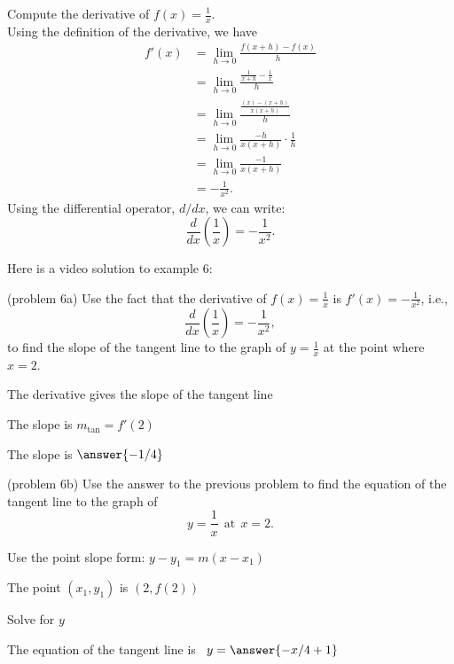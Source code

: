 \documentclass[handout]{ximera}
\begin{document}
\begin{example}[example 6]
Compute the derivative of $f(x) = \displaystyle{\frac{1}{x}}$.\\
Using the definition of the derivative, we have
\begin{align*}
f'(x) &= \lim_{h \to 0} \frac{f(x+h)-f(x)}{h}\\[5pt]
&= \lim_{h \to 0} \frac{\frac{1}{x+h}- \frac{1}{x}}{h}\\[5pt]
&= \lim_{h \to 0} \frac{\frac{(x) - (x+h)}{x(x+h)}}{h} \\[5pt]
&=  \lim_{h \to 0} \frac{-h}{x(x+h)}\cdot \frac{1}{h}\\[5pt]
&= \lim_{h \to 0} \frac{-1}{x(x+h)} \\[5pt]
&= -\frac{1}{x^2}.
\end{align*}
Using the differential operator, $d/dx$, we can write:
\[
 \frac{d}{dx}\left({\frac{1}{x}}\right) = -\frac{1}{x^2}.
\]
\end{example}

Here is a video solution to example 6:
\begin{foldable}
\end{foldable}


\begin{problem}(problem 6a)
Use the fact that the derivative of $f(x) = \frac{1}{x}$ is $f'(x) = -\frac{1}{x^2}$,
i.e., 
\[
\frac{d}{dx}\left(\frac{1}{x}\right) = -\frac{1}{x^2},
\]
to find the slope of the tangent line to the graph of 
$y = \frac{1}{x}$ at the point where $x = 2$.\\
\begin{hint}
The derivative gives the slope of the tangent line
\end{hint}
\begin{hint}
The slope is $m_{\text{tan}} = f'(2)$
\end{hint}
The slope is $\answer{-1/4}$
\end{problem}




\begin{problem}(problem 6b)
Use the answer to the previous problem to find the equation of the tangent line to the graph of 
\[
y = \frac{1}{x} \ \ \text{at} \  \ x=2.
\]
\begin{hint}
Use the point slope form: $y-y_1 = m(x-x_1)$
\end{hint}
\begin{hint}
The point $(x_1,y_1)$ is $(2, f(2))$
\end{hint}
\begin{hint}
Solve for $y$
\end{hint}
The equation of the tangent line is \ $y = \answer{-x/4 + 1}$
\end{problem}
\end{document}
